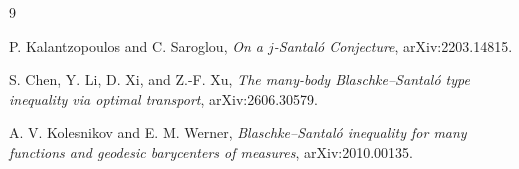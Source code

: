 \documentclass[11pt]{article}
\begin{document}
\begin{thebibliography}{9}

P. Kalantzopoulos and C. Saroglou,
\emph{On a \(j\)-Santaló Conjecture},
arXiv:2203.14815.

S. Chen, Y. Li, D. Xi, and Z.-F. Xu,
\emph{The many-body Blaschke--Santaló type inequality via optimal transport},
arXiv:2606.30579.

A. V. Kolesnikov and E. M. Werner,
\emph{Blaschke--Santaló inequality for many functions and geodesic
barycenters of measures},
arXiv:2010.00135.

\end{thebibliography}
\end{document}
